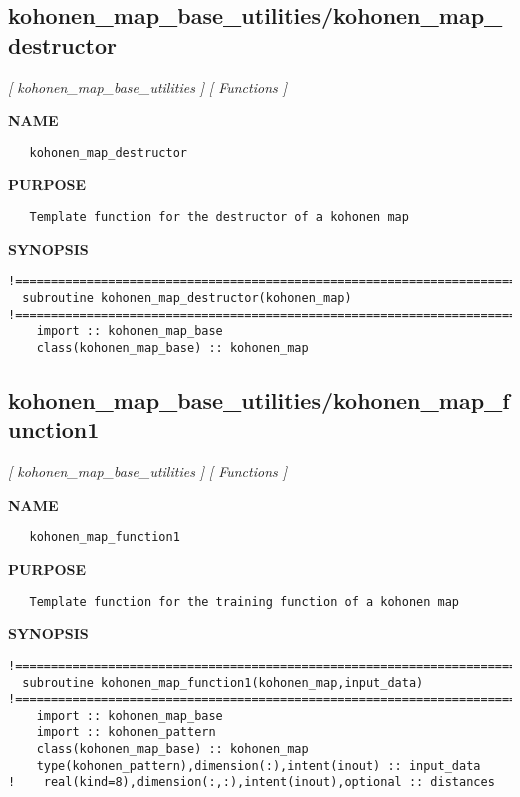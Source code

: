 \documentclass{article}
\begin{document}
\subsection{kohonen\_map\_base\_utilities/kohonen\_map\_destructor}
\textsl{[ kohonen\_map\_base\_utilities ]}
\textsl{[ Functions ]}

\label{ch:robo20}
\label{ch:kohonen_map_base_utilities_kohonen_map_destructor}
\textbf{NAME}
\begin{verbatim}
   kohonen_map_destructor
\end{verbatim}
\textbf{PURPOSE}
\begin{verbatim}
   Template function for the destructor of a kohonen map
\end{verbatim}
\textbf{SYNOPSIS}
\begin{verbatim}
!========================================================================================
  subroutine kohonen_map_destructor(kohonen_map)
!========================================================================================
    import :: kohonen_map_base
    class(kohonen_map_base) :: kohonen_map
\end{verbatim}
\newpage
\subsection{kohonen\_map\_base\_utilities/kohonen\_map\_function1}
\textsl{[ kohonen\_map\_base\_utilities ]}
\textsl{[ Functions ]}

\label{ch:robo21}
\label{ch:kohonen_map_base_utilities_kohonen_map_function1}
\textbf{NAME}
\begin{verbatim}
   kohonen_map_function1
\end{verbatim}
\textbf{PURPOSE}
\begin{verbatim}
   Template function for the training function of a kohonen map
\end{verbatim}
\textbf{SYNOPSIS}
\begin{verbatim}
!========================================================================================
  subroutine kohonen_map_function1(kohonen_map,input_data)
!========================================================================================
    import :: kohonen_map_base
    import :: kohonen_pattern
    class(kohonen_map_base) :: kohonen_map
    type(kohonen_pattern),dimension(:),intent(inout) :: input_data
!    real(kind=8),dimension(:,:),intent(inout),optional :: distances
\end{verbatim}
\newpage
\end{document}
